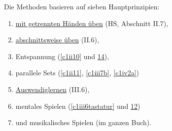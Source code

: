 Die Methoden basieren auf sieben Hauptprinzipien:

\begin{enumerate}[label={\arabic*.}] 
 \item \hyperref[c1ii7]{mit getrennten Händen üben} (HS, Abschnitt II.7),
 \item \hyperref[c1ii6]{abschnittsweise üben} (II.6),
 \item Entspannung (\hyperref[c1ii10]{\autoref{c1ii10}} und \hyperref[c1ii14]{14}),
 \item parallele Sets (\hyperref[c1ii11]{\autoref{c1ii11}}, \hyperref[c1iii7b]{\autoref{c1iii7b}}, \hyperref[c1iv2a]{\autoref{c1iv2a}})
 \item \hyperref[c1iii6]{Auswendiglernen} (III.6),
 \item mentales Spielen (\hyperref[c1iii6tastatur]{\autoref{c1iii6tastatur}} und \hyperref[c1iii12]{12})
 \item und musikalisches Spielen (im ganzen Buch).
\end{enumerate}

